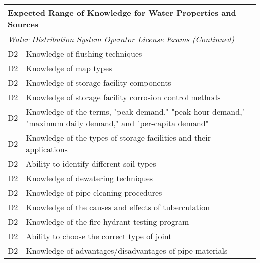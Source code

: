 \begin{table}[H]
\begin{tabular}{| m{1cm} |m{15cm} |}
\hline
\multicolumn{2}{|l|}{\textbf{Expected   Range of Knowledge for Water Properties and Sources}}                                                                      \\ \hline
\multicolumn{2}{|l|}{\textit{Water   Distribution System Operator License Exams (Continued)}}                                                                  \\ \hline
D2 & Knowledge of flushing   techniques                                                                             \\ \hline
D2 & Knowledge of map   types                                                                                       \\ \hline
D2 & Knowledge of storage   facility components                                                                     \\ \hline
D2 & Knowledge of storage   facility corrosion control methods                                                      \\ \hline
D2 & Knowledge of the   terms, "peak demand," "peak hour demand," "maximum   daily demand," and "per-capita demand" \\ \hline
D2 & Knowledge of the   types of storage facilities and their applications                                          \\ \hline
D2 & Ability to identify   different soil types                                                                     \\ \hline
D2 & Knowledge of   dewatering techniques                                                                           \\ \hline
D2 & Knowledge of pipe   cleaning procedures                                                                        \\ \hline
D2 & Knowledge of the   causes and effects of tuberculation                                                         \\ \hline
D2 & Knowledge of the fire   hydrant testing program                                                                \\ \hline
D2 & Ability to choose the   correct type of joint                                                                  \\ \hline
D2 & Knowledge of   advantages/disadvantages of pipe materials                                                      \\ \hline

\end{tabular}
\end{table}
